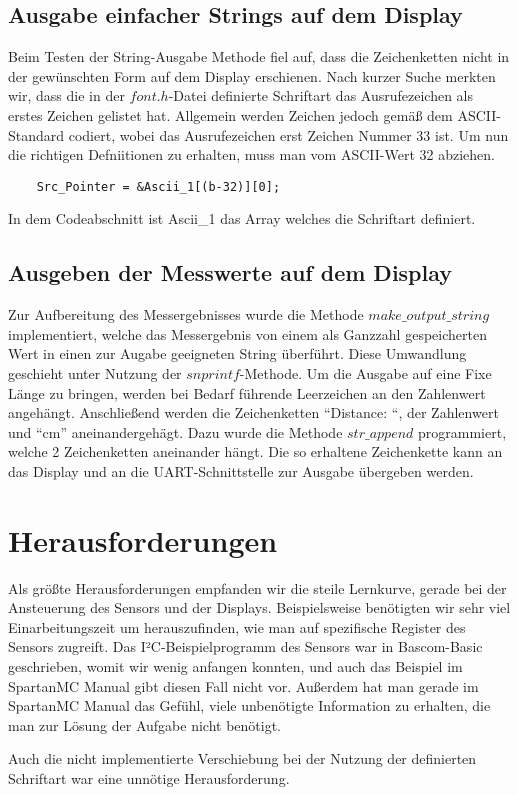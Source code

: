 \documentclass[parskip,
							 oneside,
							 11pt,
							 noheadingspace,
							 accentcolor=tud1d,
							 bigchapter,
							 colorback]{tudreport}
\begin{document}
\section{Ausgabe einfacher Strings auf dem Display}
	Beim Testen der String-Ausgabe Methode fiel auf, dass die Zeichenketten nicht in der gewünschten Form auf dem Display erschienen. Nach kurzer Suche merkten wir, dass die in der $font.h$-Datei definierte Schriftart das Ausrufezeichen als erstes Zeichen gelistet hat. Allgemein werden Zeichen jedoch gemäß dem ASCII-Standard codiert, wobei das Ausrufezeichen erst Zeichen Nummer 33 ist. Um nun die richtigen Defniitionen zu erhalten, muss man vom ASCII-Wert 32 abziehen. 
	\begin{lstlisting}
	Src_Pointer = &Ascii_1[(b-32)][0];
	\end{lstlisting}
In dem Codeabschnitt ist Ascii\_1 das Array welches die Schriftart definiert. 

\section{Ausgeben der Messwerte auf dem Display}
	Zur Aufbereitung des Messergebnisses wurde die Methode $make\_output\_string$ implementiert, welche das Messergebnis von einem als Ganzzahl gespeicherten Wert in einen zur Augabe geeigneten String überführt. Diese Umwandlung geschieht unter Nutzung der $snprintf$-Methode. Um die Ausgabe auf eine Fixe Länge zu bringen, werden bei Bedarf führende Leerzeichen an den Zahlenwert angehängt. Anschließend werden die Zeichenketten ``Distance: ``, der Zahlenwert und ``cm'' aneinandergehägt. Dazu wurde die Methode $str\_append$ programmiert, welche 2 Zeichenketten aneinander hängt. Die so erhaltene Zeichenkette kann an das Display und an die UART-Schnittstelle zur Ausgabe übergeben werden.

\chapter{Herausforderungen}

Als größte Herausforderungen empfanden wir die steile Lernkurve, gerade bei der Ansteuerung des Sensors und der Displays. Beispielsweise benötigten wir sehr viel Einarbeitungszeit um herauszufinden, wie man auf spezifische Register des Sensors zugreift. Das I²C-Beispielprogramm des Sensors war in Bascom-Basic geschrieben, womit wir wenig anfangen konnten, und auch das Beispiel im SpartanMC Manual gibt diesen Fall nicht vor. Außerdem hat man gerade im SpartanMC Manual das Gefühl, viele unbenötigte Information zu erhalten, die man zur Lösung der Aufgabe nicht benötigt.

Auch die nicht implementierte Verschiebung bei der Nutzung der definierten Schriftart war eine unnötige Herausforderung. 


\clearpage

\end{document}
